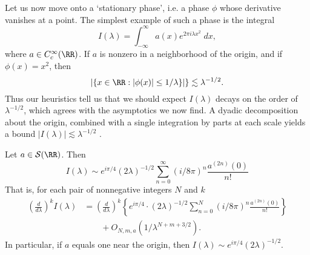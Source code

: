 Let us now move onto a `stationary phase', i.e. a phase $\phi$ whose derivative vanishes at a point. The simplest example of such a phase is the integral
%
\[ I(\lambda) = \int_{-\infty}^\infty a(x) e^{2 \pi i \lambda x^2}\; dx, \]
%
where $a \in C_c^\infty(\RR)$. If $a$   is nonzero in a neighborhood of the origin, and if $\phi(x) = x^2$, then
%
\[ |\{ x \in \RR : |\phi(x)| \leq 1/\lambda \}| \} \lesssim \lambda^{-1/2}. \]
%
Thus our heuristics tell us that we should expect $I(\lambda)$ decays on the order of $\lambda^{-1/2}$, which agrees with the asymptotics we now find. A dyadic decomposition about the origin, combined with a single integration by parts at each scale yields a bound $|I(\lambda)| \lesssim \lambda^{-1/2}$
.
\begin{theorem}
  Let $a \in \mathcal{S}(\RR)$. Then
  \[ I(\lambda) \sim e^{i \pi / 4} (2\lambda)^{-1/2} \sum_{n = 0}^\infty \left( i / 8 \pi \right)^n \frac{a^{(2n)}(0)}{n!} \]
  That is, for each pair of nonnegative integers $N$ and $k$
  \begin{align*}
    \left( \frac{d}{d\lambda} \right)^k I(\lambda) &= \left( \frac{d}{d\lambda} \right)^k \left\{ e^{i \pi / 4} \cdot (2\lambda)^{-1/2} \sum_{n = 0}^N \left( i / 8 \pi \right)^n \frac{a^{(2n)}(0)}{n!} \right\}\\
    &\quad\quad + O_{N,m,a}(1/\lambda^{N + m + 3/2}).
  \end{align*}
  In particular, if $a$ equals one near the origin, then $I(\lambda) \sim e^{i \pi / 4} (2 \lambda)^{-1/2}$.
\end{theorem}

